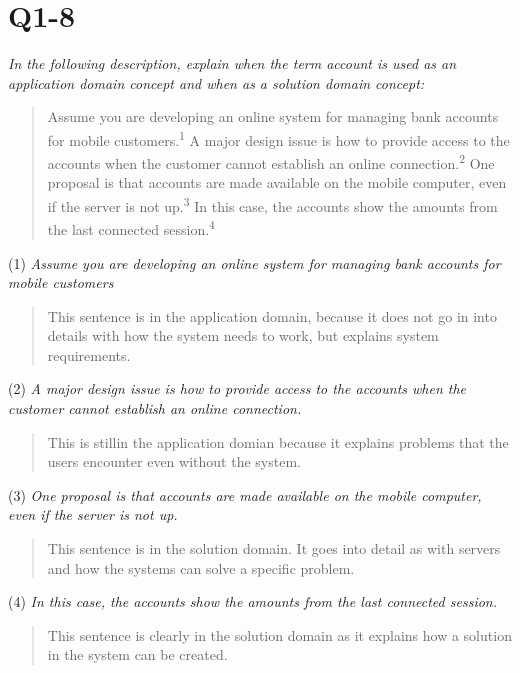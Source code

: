 \section{Q1-8}
\emph{In the following description, explain when the term account is used as an application domain concept and when as a solution domain concept:}\\
\begin{quote}
Assume you are developing an online system for managing bank accounts for mobile customers.\textsuperscript{1} A major design issue is how to provide access to the accounts when the customer cannot establish an online connection.\textsuperscript{2} One proposal is that accounts are made available on the mobile computer, even if the server is not up.\textsuperscript{3} In this case, the accounts show the amounts from the last connected session.\textsuperscript{4}\\
\end{quote}
(1) \emph{Assume you are developing an online system for managing bank accounts for mobile customers}
\begin{quote}
This sentence is in the application domain, because it does not go in into details with how the system needs to work, but explains system requirements.\\
\end{quote}

(2) \emph{A major design issue is how to provide access to the accounts when the customer cannot establish an online connection.}
\begin{quote}
This is stillin the application domian because it explains problems that the users encounter even without the system.\\
\end{quote}

(3) \emph{One proposal is that accounts are made available on the mobile computer, even if the server is not up.} 
\begin{quote}
This sentence is in the solution domain. It goes into detail as with servers and how the systems can solve a specific problem.\\
\end{quote}

(4) \emph{In this case, the accounts show the amounts from the last connected session.}
\begin{quote}
This sentence is clearly in the solution domain as it explains how a solution in the system can be created.
\end{quote}